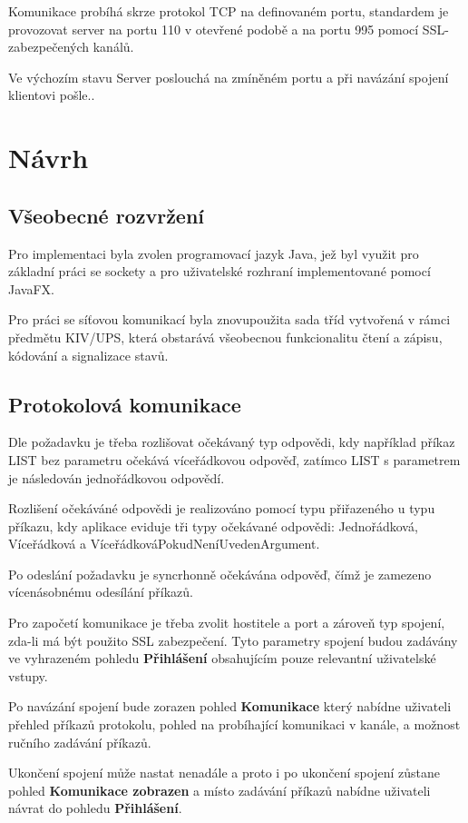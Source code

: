 \documentclass[12pt,a4paper]{article}
\let\oldsection\section
\renewcommand\section{\clearpage\oldsection}
\begin{document}
Komunikace probíhá skrze protokol TCP na definovaném portu, standardem je provozovat server na portu 110 v otevřené podobě a na portu 995 pomocí SSL-zabezpečených kanálů.

Ve výchozím stavu Server poslouchá na zmíněném portu a při navázání spojení klientovi pošle..

\section{Návrh}
\subsection{Všeobecné rozvržení}
Pro implementaci byla zvolen programovací jazyk Java, jež byl využit pro základní práci se sockety a pro uživatelské rozhraní implementované pomocí JavaFX.

Pro práci se síťovou komunikací byla znovupoužita sada tříd vytvořená v rámci předmětu KIV/UPS, která obstarává všeobecnou funkcionalitu čtení a zápisu, kódování a signalizace stavů.

\subsection{Protokolová komunikace}
Dle požadavku je třeba rozlišovat očekávaný typ odpovědi, kdy například příkaz LIST bez parametru očekává víceřádkovou odpověď, zatímco LIST s parametrem je následován jednořádkovou odpovědí.

Rozlišení očekáváné odpovědi je realizováno pomocí typu přiřazeného u typu příkazu, kdy aplikace eviduje tři typy očekávané odpovědi: Jednořádková, Víceřádková a VíceřádkováPokudNeníUvedenArgument.

Po odeslání požadavku je syncrhonně očekávána odpověď, čímž je zamezeno vícenásobnému odesílání příkazů.

Pro započetí komunikace je třeba zvolit hostitele a port a zároveň typ spojení, zda-li má být použito SSL zabezpečení.
Tyto parametry spojení budou zadávány ve vyhrazeném pohledu \textbf{Přihlášení} obsahujícím pouze relevantní uživatelské vstupy.

Po navázání spojení bude zorazen pohled \textbf{Komunikace} který nabídne uživateli přehled příkazů protokolu, pohled na probíhající komunikaci v kanále, a možnost ručního zadávání příkazů.

Ukončení spojení může nastat nenadále a proto i po ukončení spojení zůstane pohled \textbf{Komunikace zobrazen} a místo zadávání příkazů nabídne uživateli návrat do pohledu \textbf{Přihlášení}.
\end{document}
